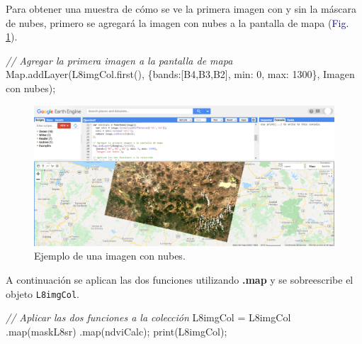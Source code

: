 \documentclass[
  12pt,
  letterpaper,
  twoside]{book}
\newenvironment{Shaded}{\begin{snugshade}}{\end{snugshade}}
\newcommand{\BuiltInTok}[1]{#1}
\newcommand{\CommentTok}[1]{\textcolor[rgb]{0.24,0.58,0.00}{\textit{#1}}}
\newcommand{\DataTypeTok}[1]{\textcolor[rgb]{0.00,0.00,0.00}{#1}}
\newcommand{\DecValTok}[1]{\textcolor[rgb]{0.28,0.53,0.93}{#1}}
\newcommand{\FunctionTok}[1]{\textcolor[rgb]{0.48,0.12,0.64}{#1}}
\newcommand{\NormalTok}[1]{#1}
\newcommand{\OperatorTok}[1]{\textcolor[rgb]{0.00,0.00,0.00}{#1}}
\newcommand{\StringTok}[1]{\textcolor[rgb]{0.87,0.29,0.22}{#1}}
\newcommand\boldpurple[1]{\textcolor{darkpurple}{\textbf{#1}}}
\begin{document}
Para obtener una muestra de cómo se ve la primera imagen con y sin la máscara de nubes, primero se agregará la imagen con nubes a la pantalla de mapa (\textcolor{darkblue}{Fig.} \ref{fig:f1017}).

\begin{Shaded}
\begin{Highlighting}[]
\CommentTok{// Agregar la primera imagen a la pantalla de mapa}
\BuiltInTok{Map}\OperatorTok{.}\FunctionTok{addLayer}\NormalTok{(L8imgCol}\OperatorTok{.}\FunctionTok{first}\NormalTok{()}\OperatorTok{,} 
\NormalTok{  \{}\DataTypeTok{bands}\OperatorTok{:}\NormalTok{[}\StringTok{\textquotesingle{}B4\textquotesingle{}}\OperatorTok{,}\StringTok{\textquotesingle{}B3\textquotesingle{}}\OperatorTok{,}\StringTok{\textquotesingle{}B2\textquotesingle{}}\NormalTok{]}\OperatorTok{,} \DataTypeTok{min}\OperatorTok{:} \DecValTok{0}\OperatorTok{,} \DataTypeTok{max}\OperatorTok{:} \DecValTok{1300}\NormalTok{\}}\OperatorTok{,}
  \StringTok{\textquotesingle{}Imagen con nubes\textquotesingle{}}\NormalTok{)}\OperatorTok{;}
\end{Highlighting}
\end{Shaded}

\begin{figure}[H]

{\centering \includegraphics[width=0.95\linewidth]{Img/imNubes} 

}

\caption{Ejemplo de una imagen con nubes.}\label{fig:f1017}
\end{figure}

A continuación se aplican las dos funciones utilizando \boldpurple{.map} y se sobreescribe el objeto \texttt{L8imgCol}.

\begin{Shaded}
\begin{Highlighting}[]
\CommentTok{// Aplicar las dos funciones a la colección}
\NormalTok{L8imgCol }\OperatorTok{=}\NormalTok{ L8imgCol}
  \OperatorTok{.}\FunctionTok{map}\NormalTok{(maskL8sr)}
  \OperatorTok{.}\FunctionTok{map}\NormalTok{(ndviCalc)}\OperatorTok{;}
\FunctionTok{print}\NormalTok{(L8imgCol)}\OperatorTok{;}
\end{Highlighting}
\end{Shaded}
\end{document}
